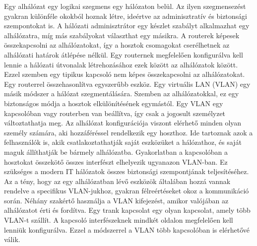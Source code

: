 
Egy alhálózat egy logikai szegmens egy hálózaton belül. Az ilyen szegmensezést
gyakran különféle okokból hoznak létre, ideértve az adminisztratív és biztonsági
szempontokat is. A hálózati adminisztrátor egy készlet szabályt alkalmazhat egy
alhálózatra, míg más szabályokat választhat egy másikra. A routerek képesek
összekapcsolni az alhálózatokat, így a hosztok csomagokat cserélhetnek az
alhálózati határok átlépése nélkül. Egy routernek megfelelően konfigurálva kell
lennie a hálózati útvonalak létrehozásához ezek között az alhálózatok között.
Ezzel szemben egy tipikus kapcsoló nem képes összekapcsolni az alhálózatokat.
Egy routerrel összehasonlítva egyszerűbb eszköz. Egy virtuális LAN (VLAN) egy
másik módszer a hálózat szegmentálására. Szemben az alhálózatokkal, ez egy
biztonságos módja a hosztok elkülönítésének egymástól. Egy VLAN egy kapcsolóban
vagy routerben van beállítva, így csak a jogosult személyzet változtathatja meg.
Az alhálózat konfigurációja viszont elérhető minden olyan személy számára, aki
hozzáféréssel rendelkezik egy hoszthoz. Ide tartoznak azok a felhasználók is,
akik csatlakoztathatják saját eszközüket a hálózathoz, és saját maguk
állíthatják be bármely alhálózatba. Gyakorlatban a kapcsolóban a hosztokat
összekötő összes interfészt elhelyezik ugyanazon VLAN-ban. Ez szükséges a modern
IT hálózatok összes biztonsági szempontjának teljesítéséhez. Az a tény, hogy az
egy alhálózatban lévő eszközök általában hozzá vannak rendelve a specifikus
VLAN-jukhoz, gyakran félreértéseket okoz a kommunikáció során. Néhány szakértő
használja a VLAN kifejezést, amikor valójában az alhálózatot érti és fordítva.
Egy trank kapcsolat egy olyan kapcsolat, amely több VLAN-t szállít. A kapcsoló
interfészeknek mindkét oldalon megfelelően kell lenniük konfigurálva. Ezzel a
módszerrel a VLAN több kapcsolóban is elérhetővé válik.
